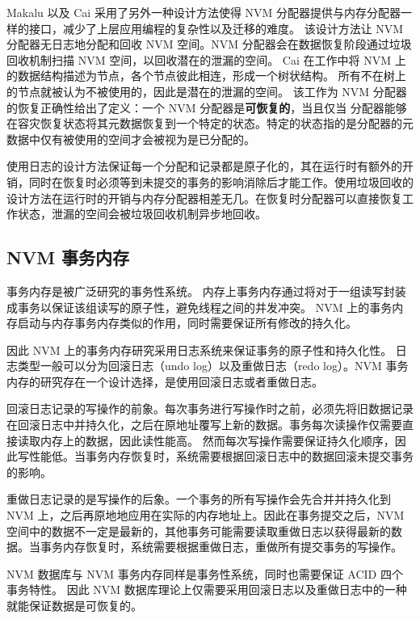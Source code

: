 Makalu\cite{bhandari_makalu_2016} 以及 Cai\cite{cai_understanding_2020} 采用了另外一种设计方法使得 NVM 分配器提供与内存分配器一样的接口，减少了上层应用编程的复杂性以及迁移的难度。
该设计方法让 NVM 分配器无日志地分配和回收 NVM 空间。NVM 分配器会在数据恢复阶段通过垃圾回收机制扫描 NVM 空间，以回收潜在的泄漏的空间。
Cai 在工作中将 NVM 上的数据结构描述为节点，各个节点彼此相连，形成一个树状结构。
所有不在树上的节点就被认为不被使用的，因此是潜在的泄漏的空间。
该工作为 NVM 分配器的恢复正确性给出了定义：一个 NVM 分配器是\textbf{可恢复的}，当且仅当
分配器能够在容灾恢复状态将其元数据恢复到一个特定的状态。特定的状态指的是分配器的元数据中仅有被使用的空间才会被视为是已分配的。

使用日志的设计方法保证每一个分配和记录都是原子化的，其在运行时有额外的开销，同时在恢复时必须等到未提交的事务的影响消除后才能工作。使用垃圾回收的设计方法在运行时的开销与内存分配器相差无几。在恢复时分配器可以直接恢复工作状态，泄漏的空间会被垃圾回收机制异步地回收。



\subsection{NVM 事务内存}

事务内存是被广泛研究的事务性系统。
内存上事务内存通过将对于一组读写封装成事务以保证该组读写的原子性，避免线程之间的并发冲突。
NVM 上的事务内存启动与内存事务内存类似的作用，同时需要保证所有修改的持久化。

因此 NVM 上的事务内存研究采用日志系统来保证事务的原子性和持久化性。
日志类型一般可以分为回滚日志（undo log）以及重做日志（redo log）。NVM 事务内存的研究存在一个设计选择，是使用回滚日志或者重做日志。

回滚日志记录的写操作的前象。每次事务进行写操作时之前，必须先将旧数据记录在回滚日志中并持久化，之后在原地址覆写上新的数据。事务每次读操作仅需要直接读取内存上的数据，因此读性能高。
然而每次写操作需要保证持久化顺序，因此写性能低。当事务内存恢复时，系统需要根据回滚日志中的数据回滚未提交事务的影响。


重做日志记录的是写操作的后象。一个事务的所有写操作会先合并并持久化到 NVM 上，之后再原地地应用在实际的内存地址上。因此在事务提交之后，NVM 空间中的数据不一定是最新的，其他事务可能需要读取重做日志以获得最新的数据。当事务内存恢复时，系统需要根据重做日志，重做所有提交事务的写操作。

NVM 数据库与 NVM 事务内存同样是事务性系统，同时也需要保证 ACID 四个事务特性。
因此 NVM 数据库理论上仅需要采用回滚日志以及重做日志中的一种就能保证数据是可恢复的。

